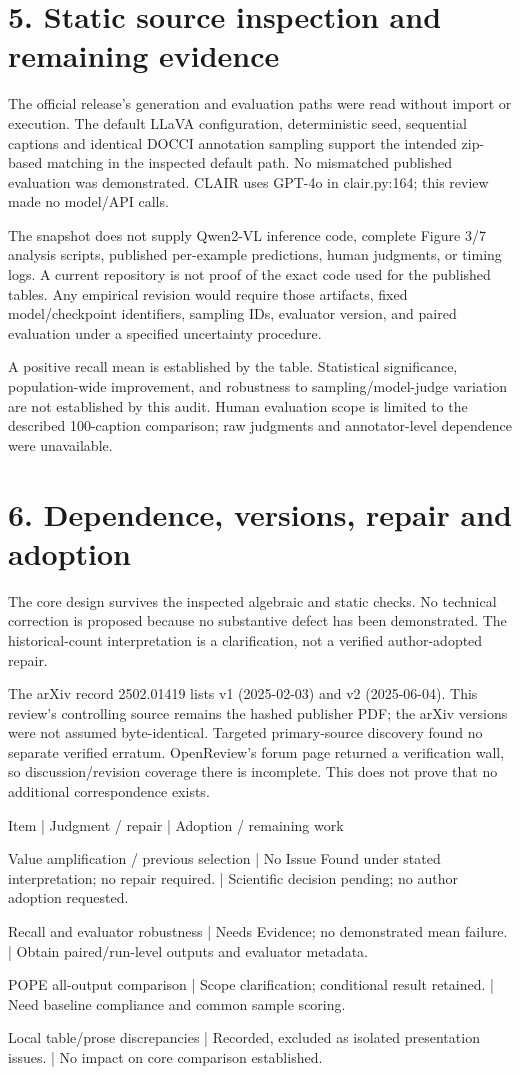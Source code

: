 \documentclass[10pt]{article}
\begin{document}
\section*{5. Static source inspection and remaining evidence}
The official release’s generation and evaluation paths were read without import or execution. The default LLaVA configuration, deterministic seed, sequential captions and identical DOCCI annotation sampling support the intended zip-based matching in the inspected default path. No mismatched published evaluation was demonstrated. CLAIR uses GPT-4o in clair.py:164; this review made no model/API calls.\par
The snapshot does not supply Qwen2-VL inference code, complete Figure 3/7 analysis scripts, published per-example predictions, human judgments, or timing logs. A current repository is not proof of the exact code used for the published tables. Any empirical revision would require those artifacts, fixed model/checkpoint identifiers, sampling IDs, evaluator version, and paired evaluation under a specified uncertainty procedure.\par
A positive recall mean is established by the table. Statistical significance, population-wide improvement, and robustness to sampling/model-judge variation are not established by this audit. Human evaluation scope is limited to the described 100-caption comparison; raw judgments and annotator-level dependence were unavailable.\par
\section*{6. Dependence, versions, repair and adoption}
The core design survives the inspected algebraic and static checks. No technical correction is proposed because no substantive defect has been demonstrated. The historical-count interpretation is a clarification, not a verified author-adopted repair.\par
The arXiv record 2502.01419 lists v1 (2025-02-03) and v2 (2025-06-04). This review’s controlling source remains the hashed publisher PDF; the arXiv versions were not assumed byte-identical. Targeted primary-source discovery found no separate verified erratum. OpenReview’s forum page returned a verification wall, so discussion/revision coverage there is incomplete. This does not prove that no additional correspondence exists.\par
Item | Judgment / repair | Adoption / remaining work\par
Value amplification / previous selection | No Issue Found under stated interpretation; no repair required. | Scientific decision pending; no author adoption requested.\par
Recall and evaluator robustness | Needs Evidence; no demonstrated mean failure. | Obtain paired/run-level outputs and evaluator metadata.\par
POPE all-output comparison | Scope clarification; conditional result retained. | Need baseline compliance and common sample scoring.\par
Local table/prose discrepancies | Recorded, excluded as isolated presentation issues. | No impact on core comparison established.\par
\end{document}
